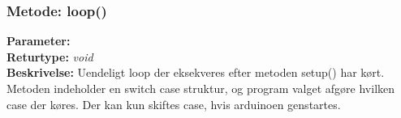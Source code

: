 \subsubsection{Metode: loop()}
\textbf{Parameter: }
\\ \textbf{Returtype: } \textit{void}
\\ \textbf{Beskrivelse: } Uendeligt loop der eksekveres efter metoden setup() har kørt. Metoden indeholder en switch case struktur, og program valget afgøre hvilken case der køres. Der kan kun skiftes case, hvis arduinoen genstartes. 